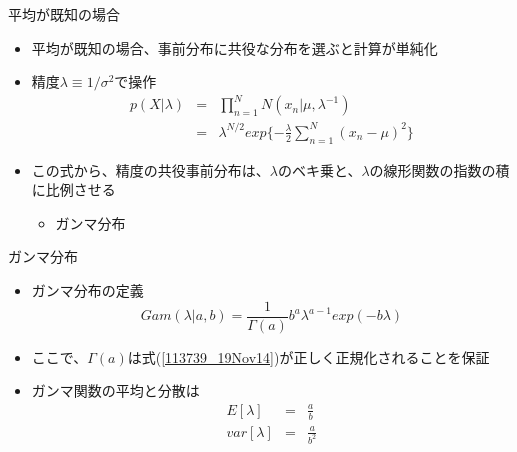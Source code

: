 \begin{frame}{平均が既知の場合}
 \begin{itemize}
  \item \alert{平均が既知}の場合、事前分布に共役な分布を選ぶと計算が単純化
  \item 精度$\lambda\equiv 1/\sigma^2$で操作
        \begin{eqnarray}
         p(X|\lambda) &=& \prod_{n=1}^{N}N(x_n|\mu,\lambda^{-1}) \nonumber \\
         &=& \lambda^{N/2}exp\{-\frac{\lambda}{2}\sum_{n=1}^{N}(x_n-\mu)^2\}\label{114403_19Nov14}
        \end{eqnarray}
  \item この式から、精度の共役事前分布は、$\lambda$のベキ乗と、$\lambda$の線形関数の指数の積に比例させる
        \begin{itemize}
         \item \alert{ガンマ分布}
        \end{itemize}
 \end{itemize}
\end{frame}


\begin{frame}{ガンマ分布}
 \begin{itemize}
  \item ガンマ分布の定義
        \begin{equation}
         Gam(\lambda|a,b) = \frac{1}{\Gamma(a)}b^a\lambda^{a-1}exp(-b\lambda)\label{113739_19Nov14}
        \end{equation}
  \item ここで、$\Gamma(a)$は式(\ref{113739_19Nov14})が正しく正規化されることを保証
  \item ガンマ関数の平均と分散は
        \begin{eqnarray}
         E[\lambda] &=& \frac{a}{b}\\
         var[\lambda]& =& \frac{a}{b^2}
        \end{eqnarray}
 \end{itemize}
\end{frame}

